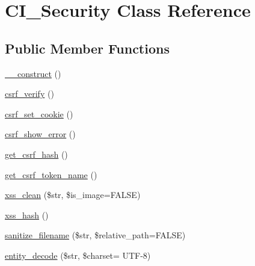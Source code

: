 \hypertarget{class_c_i___security}{}\section{C\+I\+\_\+\+Security Class Reference}
\label{class_c_i___security}
\subsection*{Public Member Functions}
\begin{DoxyCompactItemize}
\item 
\hyperlink{class_c_i___security_a095c5d389db211932136b53f25f39685}{\+\_\+\+\_\+construct} ()
\item 
\hyperlink{class_c_i___security_a03c037268db0c2e6221b65a736eaee07}{csrf\+\_\+verify} ()
\item 
\hyperlink{class_c_i___security_a55b1380b93b71ab3d9873bb967c2b9bb}{csrf\+\_\+set\+\_\+cookie} ()
\item 
\hyperlink{class_c_i___security_a3d09c1dc706abfaad987661805c28a06}{csrf\+\_\+show\+\_\+error} ()
\item 
\hyperlink{class_c_i___security_a1644fd8967db3a1b94988d730ca34991}{get\+\_\+csrf\+\_\+hash} ()
\item 
\hyperlink{class_c_i___security_a00640f51b90b7d946e9d3a4f0c9f628e}{get\+\_\+csrf\+\_\+token\+\_\+name} ()
\item 
\hyperlink{class_c_i___security_acb759426dbab128d3d8164805225381c}{xss\+\_\+clean} (\$str, \$is\+\_\+image=F\+A\+L\+SE)
\item 
\hyperlink{class_c_i___security_ae2f831d3f277e1c03730b28fd1734186}{xss\+\_\+hash} ()
\item 
\hyperlink{class_c_i___security_aaba16489285496bdc03fd12f699a08f6}{sanitize\+\_\+filename} (\$str, \$relative\+\_\+path=F\+A\+L\+SE)
\item 
\hyperlink{class_c_i___security_a4adc45e6518de72122e8153f070e09b7}{entity\+\_\+decode} (\$str, \$charset= \textquotesingle{}U\+TF-\/8\textquotesingle{})
\end{DoxyCompactItemize}
